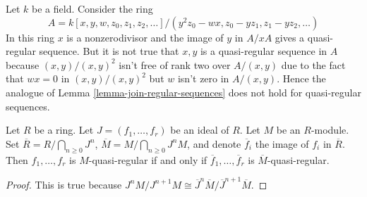 \begin{remark}
\label{remark-join-quasi-regular-sequences}
Let $k$ be a field. Consider the ring
$$
A = k[x, y, w, z_0, z_1, z_2, \ldots]/
(y^2z_0 - wx, z_0 - yz_1, z_1 - yz_2, \ldots)
$$
In this ring $x$ is a nonzerodivisor and the image of $y$ in
$A/xA$ gives a quasi-regular sequence. But it is not true that
$x, y$ is a quasi-regular sequence in $A$ because $(x, y)/(x, y)^2$
isn't free of rank two over $A/(x, y)$ due to the fact that
$wx = 0$ in $(x, y)/(x, y)^2$ but $w$ isn't zero in $A/(x, y)$.
Hence the analogue of
Lemma \ref{lemma-join-regular-sequences}
does not hold for quasi-regular sequences.
\end{remark}

\begin{lemma}
\label{lemma-quasi-regular-on-quotient}
Let $R$ be a ring. Let $J = (f_1, \ldots, f_r)$ be an ideal of $R$.
Let $M$ be an $R$-module. Set $\overline{R} = R/\bigcap_{n \geq 0} J^n$,
$\overline{M} = M/\bigcap_{n \geq 0} J^nM$, and denote
$\overline{f}_i$ the image of $f_i$ in $\overline{R}$.
Then $f_1, \ldots, f_r$ is $M$-quasi-regular if and only if
$\overline{f}_1, \ldots, \overline{f}_r$ is $\overline{M}$-quasi-regular.
\end{lemma}

\begin{proof}
This is true because
$J^nM/J^{n + 1}M \cong
\overline{J}^n\overline{M}/\overline{J}^{n + 1}\overline{M}$.
\end{proof}





